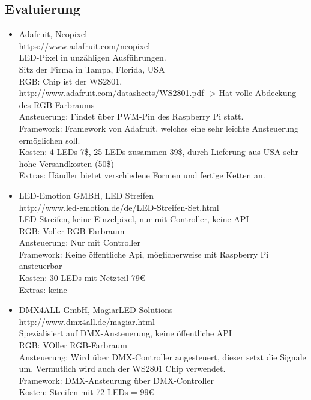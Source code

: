 \subsection{Evaluierung}
\begin{itemize}
\item Adafruit, Neopixel \\
https://www.adafruit.com/neopixel \\
LED-Pixel in unzähligen Ausführungen. \\
Sitz der Firma in Tampa, Florida, USA \\
RGB: Chip ist der WS2801, http://www.adafruit.com/datasheets/WS2801.pdf -> Hat volle Abdeckung des RGB-Farbraums \\
Ansteuerung: Findet über PWM-Pin des Raspberry Pi statt. \\
Framework: Framework von Adafruit, welches eine sehr leichte Ansteuerung ermöglichen soll. \\
Kosten: 4 LEDs  7\$, 25 LEDs zusammen  39\$, durch Lieferung aus USA sehr hohe Versandkosten (50\$) \\
Extras: Händler bietet verschiedene Formen und fertige Ketten an. \\
\item LED-Emotion GMBH, LED Streifen \\
http://www.led-emotion.de/de/LED-Streifen-Set.html \\
LED-Streifen, keine Einzelpixel, nur mit Controller, keine API \\
RGB: Voller RGB-Farbraum \\
Ansteuerung: Nur mit Controller  \\
Framework: Keine öffentliche Api, möglicherweise mit Raspberry Pi ansteuerbar  \\
Kosten: 30 LEDs mit Netzteil 79€   \\
Extras: keine
\item DMX4ALL GmbH, MagiarLED Solutions \\
http://www.dmx4all.de/magiar.html \\
Spezialisiert auf DMX-Ansteuerung, keine öffentliche API \\
RGB: VOller RGB-Farbraum \\
Ansteuerung: Wird über DMX-Controller angesteuert, dieser setzt die Signale um. Vermutlich wird auch der WS2801 Chip verwendet. \\
Framework: DMX-Ansteurung über DMX-Controller \\
Kosten: Streifen mit 72 LEDs = 99€ \\

\end{itemize}
